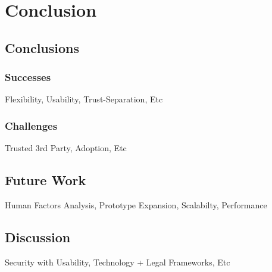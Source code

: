 \chapter{Conclusion}
\label{chap:conclusion}

\section{Conclusions}

\subsection{Successes}

Flexibility, Usability, Trust-Separation, Etc

\subsection{Challenges}

Trusted 3rd Party, Adoption, Etc

\section{Future Work}

Human Factors Analysis, Prototype Expansion, Scalabilty, Performance

\section{Discussion}

Security with Usability, Technology + Legal Frameworks, Etc
